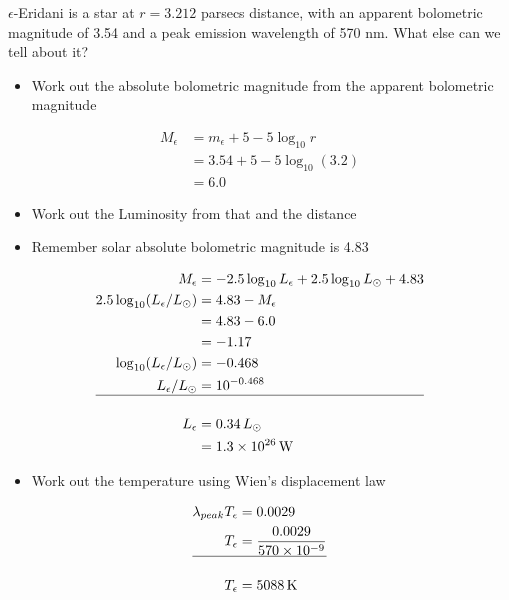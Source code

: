 \documentclass[
  letterpaper,
  DIV=11,
  numbers=noendperiod]{scrreprt}
\providecommand{\tightlist}{%
  \setlength{\itemsep}{0pt}\setlength{\parskip}{0pt}}\usepackage{longtable,booktabs,array}
\begin{document}
\(\epsilon\)-Eridani is a star at \(r=3.212\) parsecs distance, with an
apparent bolometric magnitude of 3.54 and a peak emission wavelength of
570 nm. What else can we tell about it?

\begin{itemize}
\tightlist
\item
  Work out the absolute bolometric magnitude from the apparent
  bolometric magnitude
\end{itemize}

\begin{align}
M_\epsilon &= m_\epsilon + 5 - 5\log_{10}r \\
  &= 3.54 + 5 - 5\log_{10}(3.2) \\
  &= 6.0
\end{align}

\begin{itemize}
\tightlist
\item
  Work out the Luminosity from that and the distance
\item
  Remember solar absolute bolometric magnitude is 4.83
\end{itemize}

\begin{align}
M_{\epsilon} &= -2.5\log_{10}L_\epsilon+2.5\log_{10}L_\odot + 4.83 \\
2.5\log_{10}(L_\epsilon / L_\odot) &= 4.83 - M_\epsilon \\
&= 4.83 - 6.0  \\
&= -1.17 \\
\log_{10}(L_\epsilon / L_\odot) & = -0.468 \\
L_\epsilon / L_\odot &= 10^{-0.468} \\
\hline \\
L_\epsilon &= 0.34\,L_\odot \\
&= 1.3\times 10^{26}\,\mathrm{W}
\end{align}

\begin{itemize}
\tightlist
\item
  Work out the temperature using Wien's displacement law
\end{itemize}

\begin{align}
\lambda_{peak} T_\epsilon &= 0.0029 \\
T_\epsilon &= \frac{0.0029}{ 570\times 10^{-9}} \\
\hline \\
T_\epsilon &= 5088\,\mathrm{K}
\end{align}
\end{document}

